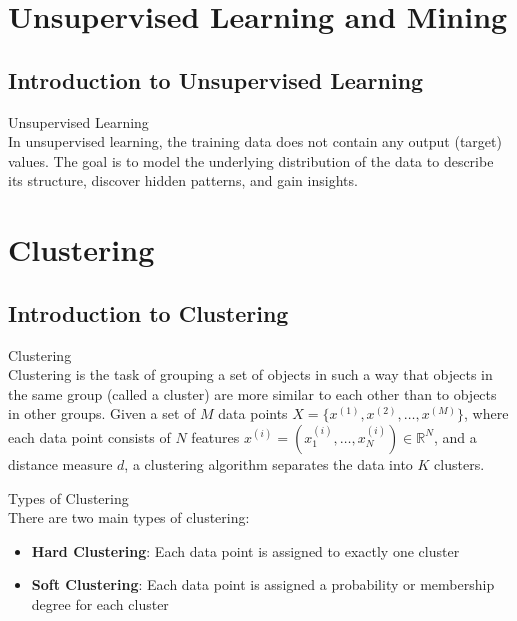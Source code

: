 \section{Unsupervised Learning and Mining}

\subsection{Introduction to Unsupervised Learning}

\begin{definition}{Unsupervised Learning}\\
In unsupervised learning, the training data does not contain any output (target) values. The goal is to model the underlying distribution of the data to describe its structure, discover hidden patterns, and gain insights.
\end{definition}

\section{Clustering}

\subsection{Introduction to Clustering}

\begin{definition}{Clustering}\\
Clustering is the task of grouping a set of objects in such a way that objects in the same group (called a cluster) are more similar to each other than to objects in other groups. Given a set of $M$ data points $X = \{x^{(1)}, x^{(2)}, \ldots, x^{(M)}\}$, where each data point consists of $N$ features $x^{(i)} = (x^{(i)}_1, \ldots, x^{(i)}_N) \in \mathbb{R}^N$, and a distance measure $d$, a clustering algorithm separates the data into $K$ clusters.
\end{definition}

\begin{concept}{Types of Clustering}\\
There are two main types of clustering:
\begin{itemize}
    \item \textbf{Hard Clustering}: Each data point is assigned to exactly one cluster
    \item \textbf{Soft Clustering}: Each data point is assigned a probability or membership degree for each cluster
\end{itemize}
\end{concept}

